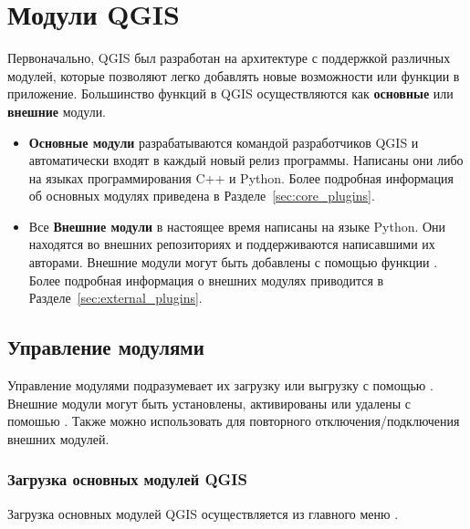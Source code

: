 
\chapter{Модули QGIS}\label{sec:plugins}


Первоначально, QGIS был разработан на архитектуре с поддержкой различных
модулей, которые позволяют легко добавлять новые возможности или функции
в приложение. Большинство функций в QGIS осуществляются как
\textbf{основные} или \textbf{внешние} модули.

\begin{itemize}[label=--]
\item \textbf{Основные модули} разрабатываются командой разработчиков
QGIS и автоматически входят в каждый новый релиз программы. Написаны они
либо на языках программирования C++ и Python. Более подробная информация
об основных модулях приведена в Разделе~\ref{sec:core_plugins}.
\item Все \textbf{Внешние модули} в настоящее время написаны на языке
Python. Они находятся во внешних репозиториях и поддерживаются
написавшими их авторами. Внешние модули могут быть добавлены с помощью
функции . Более подробная информация
о внешних модулях приводится в Разделе~\ref{sec:external_plugins}.
\end{itemize}

\section{Управление модулями}\label{sec:managing_plugins}

Управление модулями подразумевает их загрузку или выгрузку с помощью
. Внешние модули могут быть установлены,
активированы или удалены с помошью .
Также  можно использовать для повторного
отключения/подключения внешних модулей.

\subsection{Загрузка основных модулей QGIS}\label{sec:load_core_plugin}

Загрузка основных модулей QGIS осуществляется из главного меню
 \arrow
{}.

